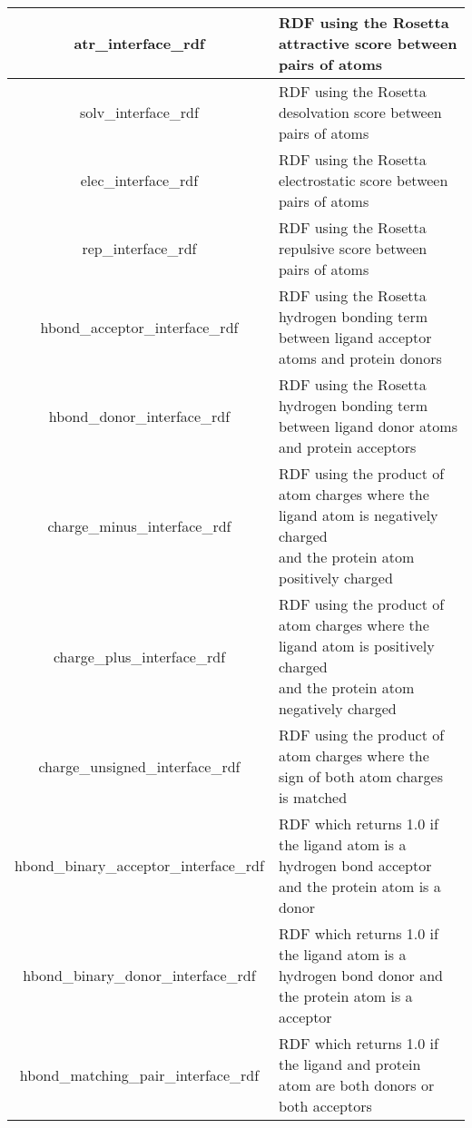 \begin{tabular}{|c|l|}
\hline
atr\_interface\_rdf & RDF using the Rosetta attractive score between pairs of atoms\\
\hline
solv\_interface\_rdf & RDF using the Rosetta desolvation score between pairs of atoms \\
\hline
elec\_interface\_rdf & RDF using the Rosetta electrostatic score between pairs of atoms\\
\hline
rep\_interface\_rdf & RDF using the Rosetta repulsive score between pairs of atoms \\
\hline
hbond\_acceptor\_interface\_rdf & RDF using the Rosetta hydrogen bonding term between ligand acceptor atoms and protein donors\\
\hline
hbond\_donor\_interface\_rdf & RDF using the Rosetta hydrogen bonding term between ligand donor atoms and protein acceptors\\
\hline
charge\_minus\_interface\_rdf & \pbox{4in}{RDF using the product of atom charges where the ligand atom is negatively charged \\
and the protein atom positively charged}\\
\hline
charge\_plus\_interface\_rdf & \pbox{4in}{RDF using the product of atom charges where the ligand atom is positively charged \\
and the protein atom negatively charged}\\
\hline
charge\_unsigned\_interface\_rdf & RDF using the product of atom charges where the sign of both atom charges is matched  \\
\hline
hbond\_binary\_acceptor\_interface\_rdf & RDF which returns 1.0 if the ligand atom is a hydrogen bond acceptor and the protein atom is a donor\\
\hline 
hbond\_binary\_donor\_interface\_rdf & RDF which returns 1.0 if the ligand atom is a hydrogen bond donor and the protein atom is a acceptor\\
\hline 
hbond\_matching\_pair\_interface\_rdf & RDF which returns 1.0 if the ligand and protein atom are both donors or both acceptors\\
\hline
\end{tabular}

